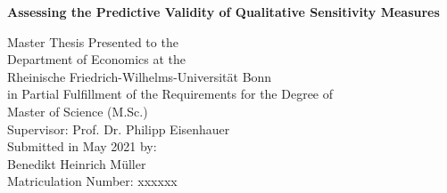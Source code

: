 \begin{titlepage}

    \begin{center}

    \vspace*{1.0cm}

    {\LARGE
    \bfseries Assessing the Predictive Validity of Qualitative Sensitivity Measures \\
    \vspace*{0.5cm}
    }%


    {\large
    \vspace*{4.0cm}
    Master Thesis Presented to the\\
    \vspace*{0.25cm}
    Department of Economics at the\\
    \vspace*{0.25cm}
    Rheinische Friedrich-Wilhelms-Universität Bonn\\

    \vspace*{2.0cm}
    in Partial Fulfillment of the Requirements for the Degree of\\
    \vspace*{0.25cm}
    Master of Science (M.Sc.)\\

    \vspace*{4.0cm}
    Supervisor: Prof. Dr. Philipp Eisenhauer\\

    \vspace*{2.0cm}
    Submitted in May 2021 by:\\
    Benedikt Heinrich Müller\\
    Matriculation Number: xxxxxx
    }

    \end{center}

    \end{titlepage}